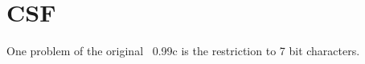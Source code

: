 
\section{CSF}%

One problem of the original \BibTeX~0.99c is the restriction to 7 bit
characters.

\INCOMPLETE


\endinput
%
